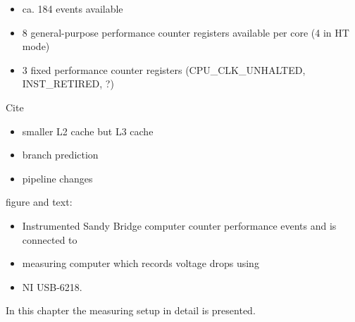 \label{sec:sandy-bridge-pmu}

\begin{itemize}

\item ca. 184 events available

\item 8 general-purpose performance counter registers available per core (4 in
      HT mode)

\item 3 fixed performance counter registers (CPU\_CLK\_UNHALTED, INST\_RETIRED,
      ?)

\end{itemize}



Cite \cite{fog11}

\begin{itemize}

\item smaller L2 cache but L3 cache

\item branch prediction

\item pipeline changes

\end{itemize}


\label{sec:big-pic}

figure and text:

\begin{itemize}

\item Instrumented Sandy Bridge computer counter performance events and is 
      connected to

\item measuring computer which records voltage drops using

\item NI USB-6218.

\end{itemize}

\label{sec:measuring-setup}

In this chapter the measuring setup in detail is presented.



